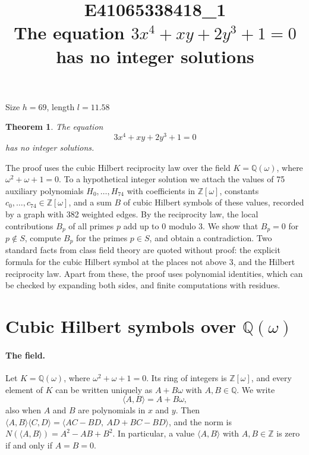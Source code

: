 \documentclass[11pt]{article}
\title{\textbf{E41065338418\_1}\\[4pt] {\Large The equation $3x^{4}+xy+2y^{3}+1=0$ has no integer solutions}}
\author{}
\date{}
\newtheorem{theorem}{Theorem}
\newcommand{\Z}{\mathbb{Z}}
\newcommand{\Q}{\mathbb{Q}}
\begin{document}
\maketitle
\vspace{-8ex}
\begin{center}
Size $h=69$, length $l=11.58$
\end{center}

\begin{theorem}\label{thm:main}
The equation
\begin{equation}\label{eq:main}
3x^{4}+xy+2y^{3}+1=0
\end{equation}
has no integer solutions.
\end{theorem}

The proof uses the cubic Hilbert reciprocity law over the field $K=\Q(\omega)$, where $\omega^2+\omega+1=0$. To a hypothetical integer solution we attach the values of 75 auxiliary polynomials $H_0,\dots,H_{74}$ with coefficients in $\Z[\omega]$, constants $c_0,\dots,c_{74}\in\Z[\omega]$, and a sum $B$ of cubic Hilbert symbols of these values, recorded by a graph with 382 weighted edges. By the reciprocity law, the local contributions $B_p$ of all primes $p$ add up to $0$ modulo $3$. We show that $B_p=0$ for $p\notin S$, compute $B_p$ for the primes $p\in S$, and obtain a contradiction. Two standard facts from class field theory are quoted without proof: the explicit formula for the cubic Hilbert symbol at the places not above $3$, and the Hilbert reciprocity law. Apart from these, the proof uses polynomial identities, which can be checked by expanding both sides, and finite computations with residues.


\section{\texorpdfstring{Cubic Hilbert symbols over $\Q(\omega)$}{Cubic Hilbert symbols over Q(w)}}\label{sec:symbols}

\paragraph{The field.} Let $K=\Q(\omega)$, where $\omega^2+\omega+1=0$. Its ring of integers is $\Z[\omega]$, and every element of $K$ can be written uniquely as $A+B\omega$ with $A,B\in\Q$. We write
\[
\langle A,B\rangle=A+B\omega,
\]
also when $A$ and $B$ are polynomials in $x$ and $y$. Then $\langle A,B\rangle\langle C,D\rangle=\langle AC-BD,\ AD+BC-BD\rangle$, and the norm is $N(\langle A,B\rangle)=A^2-AB+B^2$. In particular, a value $\langle A,B\rangle$ with $A,B\in\Z$ is zero if and only if $A=B=0$.
\end{document}
